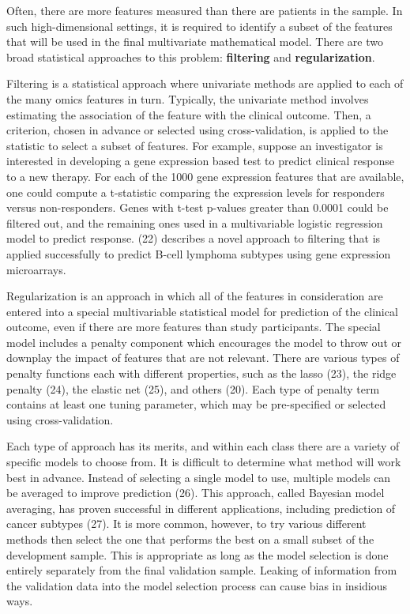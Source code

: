 \documentclass[11pt]{article}
\begin{document}
Often, there are more features measured than there are patients in the
sample. In such high-dimensional settings, it is required to identify a
subset of the features that will be used in the final multivariate
mathematical model. There are two broad statistical approaches to this
problem: \textbf{filtering} and \textbf{regularization}.

Filtering is a statistical approach where univariate methods are applied
to each of the many omics features in turn. Typically, the univariate
method involves estimating the association of the feature with the
clinical outcome. Then, a criterion, chosen in advance or selected using
cross-validation, is applied to the statistic to select a subset of
features. For example, suppose an investigator is interested in
developing a gene expression based test to predict clinical response to
a new therapy. For each of the 1000 gene expression features that are
available, one could compute a t-statistic comparing the expression
levels for responders versus non-responders. Genes with t-test p-values
greater than 0.0001 could be filtered out, and the remaining ones used
in a multivariable logistic regression model to predict response. (22)
describes a novel approach to filtering that is applied successfully to
predict B-cell lymphoma subtypes using gene expression microarrays.

Regularization is an approach in which all of the features in
consideration are entered into a special multivariable statistical model
for prediction of the clinical outcome, even if there are more features
than study participants. The special model includes a penalty component
which encourages the model to throw out or downplay the impact of
features that are not relevant. There are various types of penalty
functions each with different properties, such as the lasso (23), the
ridge penalty (24), the elastic net (25), and others (20). Each type of
penalty term contains at least one tuning parameter, which may be
pre-specified or selected using cross-validation.

Each type of approach has its merits, and within each class there are a
variety of specific models to choose from. It is difficult to determine
what method will work best in advance. Instead of selecting a single
model to use, multiple models can be averaged to improve prediction
(26). This approach, called Bayesian model averaging, has proven
successful in different applications, including prediction of cancer
subtypes (27). It is more common, however, to try various different
methods then select the one that performs the best on a small subset of
the development sample. This is appropriate as long as the model
selection is done entirely separately from the final validation sample.
Leaking of information from the validation data into the model selection
process can cause bias in insidious ways.
\end{document}
